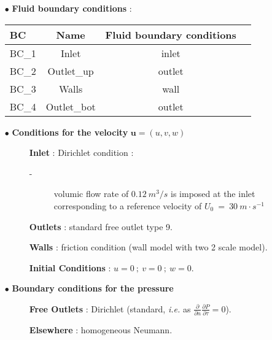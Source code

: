 \begin{itemize}

\item[$\bullet$] \textbf{Fluid boundary conditions} :

\begin{table}[H]
   \begin{center}
      \begin{tabular}{lccc}
         \hline\hline
            BC & Name & Fluid boundary conditions  \\      
         \hline
         BC\_1 & Inlet 	& inlet \\
         BC\_2 & Outlet\_up 	& outlet \\
         BC\_3 & Walls		& wall \\
         BC\_4 & Outlet\_bot 	& outlet \\
         \hline\hline
      \end{tabular}
   \end{center}
\end{table}


\item[$\bullet$] {\textbf{ Conditions for the velocity} $\textbf{u}=(u,v,w)$}
\begin{description}
\item[]{\textbf{ Inlet} :} Dirichlet condition :
\begin{description}
\item[-] volumic flow rate of $0.12~m^3/s$ is imposed at the inlet corresponding to a reference velocity of $U_0~=~30~m\cdot s^{-1}$
\end{description}
\item[]{\textbf{ Outlets} :} standard free outlet type 9.
\item[]{\textbf{ Walls} :} friction condition (wall model with two 2 scale model).
\item[]{\textbf{ Initial Conditions} :} $u=0~;~v=0~;~w=0$.
\end{description}

\item[$\bullet$] {\textbf{ Boundary conditions for the pressure}}
\begin{description}
\item[]{\textbf{ Free Outlets} :} Dirichlet (standard, {\em i.e.} as
$\frac{\partial}{\partial n}\frac{\partial P}{\partial \tau}=0$).
\item[]{\textbf{ Elsewhere} :} homogeneous Neumann.
\end{description}


\end{itemize}
